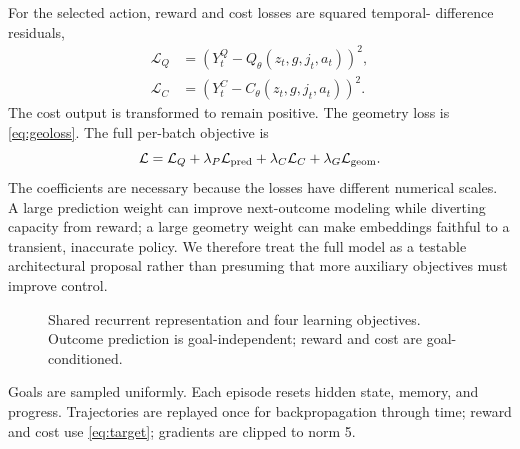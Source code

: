 \documentclass[11pt]{article}
\begin{document}
For the selected action, reward and cost losses are squared temporal-
difference residuals,
\begin{align}
 \mathcal L_Q&=(Y_t^Q-Q_\theta(z_t,g,j_t,a_t))^2,\\
 \mathcal L_C&=(Y_t^C-C_\theta(z_t,g,j_t,a_t))^2.
 \label{eq:td-losses}
\end{align}
The cost output is transformed to remain positive. The geometry loss is
\cref{eq:geoloss}. The full per-batch objective is
\begin{equation}
 \mathcal L=\mathcal L_Q+\lambda_P\mathcal L_{\rm pred}
 +\lambda_C\mathcal L_C+\lambda_G\mathcal L_{\rm geom}. \label{eq:loss}
\end{equation}
The coefficients are necessary because the losses have different numerical
scales. A large prediction weight can improve next-outcome modeling while
diverting capacity from reward; a large geometry weight can make embeddings
faithful to a transient, inaccurate policy. We therefore treat the full model
as a testable architectural proposal rather than presuming that more auxiliary
objectives must improve control.

\begin{figure}[t]
\centering
{}
\caption{Shared recurrent representation and four learning objectives. Outcome
prediction is goal-independent; reward and cost are goal-conditioned.}
\label{fig:network}
\end{figure}

Goals are sampled uniformly. Each episode resets hidden state, memory, and
progress. Trajectories are replayed once for backpropagation through time;
reward and cost use \cref{eq:target}; gradients are clipped to norm 5.
\end{document}

